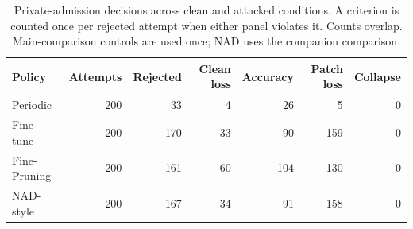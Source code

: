 \begin{table}[t]
\caption{Private-admission decisions across clean and attacked conditions. A criterion is counted once per rejected attempt when either panel violates it. Counts overlap. Main-comparison controls are used once; NAD uses the companion comparison.}
\label{tab:gates}
\centering\small\begin{tabular}{lrrrrrr}
\toprule
Policy & Attempts & Rejected & Clean loss & Accuracy & Patch loss & Collapse \\
\midrule
Periodic & 200 & 33 & 4 & 26 & 5 & 0 \\
Fine-tune & 200 & 170 & 33 & 90 & 159 & 0 \\
Fine-Pruning & 200 & 161 & 60 & 104 & 130 & 0 \\
NAD-style & 200 & 167 & 34 & 91 & 158 & 0 \\
\bottomrule\end{tabular}
\end{table}
